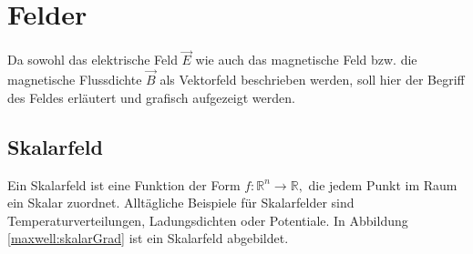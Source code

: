 %
%
% 
%
%
\section{Felder\label{maxwell:mathFormulierung}}

Da sowohl das elektrische Feld $\vec{E}$ wie auch das magnetische Feld bzw. die magnetische Flussdichte $\vec{B}$ als Vektorfeld beschrieben werden, soll hier der Begriff des Feldes erläutert und grafisch aufgezeigt werden.
%

\subsection{Skalarfeld\label{maxwell:skalarfeld}}

Ein Skalarfeld ist eine Funktion der Form
\( f\colon \mathbb{R}^n \rightarrow \mathbb{R}, \) 
%
die jedem Punkt im Raum ein Skalar zuordnet.
Alltägliche Beispiele für Skalarfelder sind Temperaturverteilungen, Ladungsdichten oder Potentiale. In Abbildung \ref{maxwell:skalarGrad} ist ein Skalarfeld abgebildet.
%
%
%


